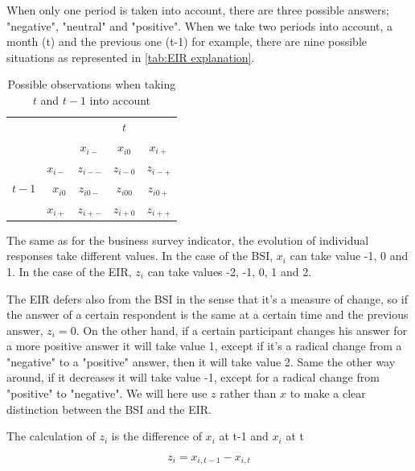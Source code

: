 \documentclass[12pt,a4paper,oneside]{book}
\begin{document}
When only one period is taken into account, there are three possible answers; "negative", "neutral" and "positive".
When we take two periods into account, a month (t) and the previous one (t-1) for example, there are nine possible situations as represented in \autoref{tab:EIR explanation}. 


\begin{table}[htp!]
     \centering \footnotesize
    \begin{tabular}{r | r | c c c | }
    \multicolumn{1}{r}{} & \multicolumn{1}{r}{} &    \multicolumn{3}{c}{$t$} \\ \cline{3-5}
    \multicolumn{1}{r}{} &         & \textbf{$x_{i-}$} & \textbf{$x_{i0}$} & \textbf{$x_{i+}$} \\ \cline{2-5}
          &    \textbf{$x_{i-}$} & $z_{i--}$    & $z_{i-0}$    & $z_{i-+}$ \\ 
    $t-1$ & \textbf{$x_{i0}$}  & $z_{i0-}$    & $z_{i00}$    & $z_{i0+}$ \\
          &    \textbf{$x_{i+}$} & $z_{i+-}$    & $z_{i+0}$    & $z_{i++}$ \\ \cline{2-5}
    \end{tabular}
    \caption{Possible observations when taking $t$ and $t-1$ into account}
    \label{tab:EIR explanation}
\end{table}

The same as for the business survey indicator, the evolution of individual responses take different values. In the case of the BSI, $x_i$ can take value -1, 0 and 1. In the case of the EIR, $z_i$ can take values -2, -1, 0, 1 and 2.

The EIR defers also from the BSI in the sense that it's a measure of change, so if the answer of a certain respondent is the same at a certain time and the previous answer, $z_i=0$. 
On the other hand, if a certain participant changes his answer for a more positive answer it will take value 1, except if it's a radical change from a "negative" to a "positive" answer, then it will take value 2.
Same the other way around, if it decreases it will take value -1, except for a radical change from "positive" to "negative".
We will here use $z$ rather than $x$ to make a clear distinction between the BSI and the EIR.

The calculation of $z_i$ is the difference of $x_i$ at t-1 and $x_i$ at t

\begin{equation}
    z_i = x_{i,t-1} - x_{i,t}
\end{equation}
\end{document}
